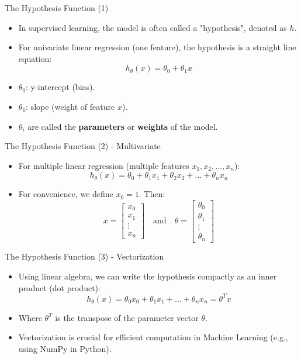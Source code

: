 \documentclass[aspectratio=169]{beamer}
\begin{document}
\begin{frame}{The Hypothesis Function (1)}
\begin{itemize}
    \item In supervised learning, the model is often called a "hypothesis", denoted as $h$.
    \item For univariate linear regression (one feature), the hypothesis is a straight line equation:
    $$ h_\theta(x) = \theta_0 + \theta_1 x $$
    \item $\theta_0$: y-intercept (bias).
    \item $\theta_1$: slope (weight of feature $x$).
    \item $\theta_i$ are called the \textbf{parameters} or \textbf{weights} of the model.
\end{itemize}
\end{frame}

\begin{frame}{The Hypothesis Function (2) - Multivariate}
\begin{itemize}
    \item For multiple linear regression (multiple features $x_1, x_2, \dots, x_n$):
    $$ h_\theta(x) = \theta_0 + \theta_1 x_1 + \theta_2 x_2 + \dots + \theta_n x_n $$
    \item For convenience, we define $x_0 = 1$. Then:
    $$ x = \begin{bmatrix} x_0 \\ x_1 \\ \vdots \\ x_n \end{bmatrix} \quad \text{and} \quad \theta = \begin{bmatrix} \theta_0 \\ \theta_1 \\ \vdots \\ \theta_n \end{bmatrix} $$
\end{itemize}
\end{frame}

\begin{frame}{The Hypothesis Function (3) - Vectorization}
\begin{itemize}
    \item Using linear algebra, we can write the hypothesis compactly as an inner product (dot product):
    $$ h_\theta(x) = \theta_0 x_0 + \theta_1 x_1 + \dots + \theta_n x_n = \theta^T x $$
    \item Where $\theta^T$ is the transpose of the parameter vector $\theta$.
    \item Vectorization is crucial for efficient computation in Machine Learning (e.g., using NumPy in Python).
\end{itemize}
\end{frame}
\end{document}
